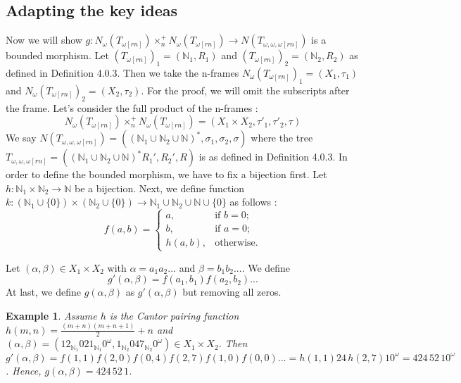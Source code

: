 \documentclass[12pt, a4paper]{scrartcl}
\newtheorem{example}[definition]{Example}
\begin{document}
\subsection{Adapting the key ideas}

    Now we will show $g : N_\omega(T_{\omega[rn]}) \times^+_n N_\omega(T_{\omega[rn]}) \rightarrow N(T_{\omega,\omega,\omega[rn]})$ is a bounded morphism. \newline 
    Let $(T_{\omega[rn]})_1 = (\mathbb{N}_{1}, R_1)$ and $(T_{\omega[rn]})_2 = (\mathbb{N}_{2}, R_2)$ as defined in Definition 4.0.3.
    Then we take the n-frames $N_\omega(T_{\omega[rn]})_1 = (X_1, \tau_1)$ and $N_\omega(T_{\omega[rn]})_2 = (X_2, \tau_2)$. For the proof, we will omit the subscripts after the frame. \newline \newline
    Let's consider the full product of the n-frames :
    $$N_\omega(T_{\omega[rn]}) \times^+_n N_\omega(T_{\omega[rn]}) = (X_1 \times X_2, \tau'_1, \tau'_2, \tau)$$
    \newline We say $N(T_{\omega,\omega,\omega[rn]}) = ((\mathbb{N}_1 \cup \mathbb{N}_2\cup \mathbb{N})^*, \sigma_1, \sigma_2, \sigma)$ where the tree $T_{\omega,\omega,\omega[rn]} = ((\mathbb{N}_1 \cup \mathbb{N}_2 \cup \mathbb{N})^*R_1',R_2',R)$ is as defined in Definition 4.0.3.
    \clearpage
    In order to define the bounded morphism, we have to fix a bijection first. Let $h : \mathbb{N}_1 \times \mathbb{N}_2 \rightarrow \mathbb{N}$ be a bijection. \newline
    Next, we define function $k :(\mathbb{N}_1 \cup \{0\}) \times (\mathbb{N}_2 \cup \{0\}) \rightarrow \mathbb{N}_1 \cup \mathbb{N}_2 \cup \mathbb{N} \cup \{0\}$ as follows :
    \[
        f(a, b) =
        \begin{cases}
        a, & \text{if } b = 0; \\
        b, & \text{if } a = 0; \\
        h(a, b), & \text{otherwise}.
        \end{cases}
    \]

    Let $(\alpha,\beta) \in X_1 \times X_2$ with $\alpha = a_1a_2...$ and $\beta = b_1b_2...$. We define 
    $$g'(\alpha,\beta) = f(a_1,b_1)f(a_2,b_2)...$$
    At last, we define $g(\alpha,\beta)$ as $g'(\alpha,\beta)$ but removing all zeros.

    \begin{example}
        Assume $h$ is the Cantor pairing function $h(m,n) = \frac{(m+n)(m+n+1)}{2} + n$ and $(\alpha, \beta) = (12_{\mathbb{N}_1}021_{\mathbb{N}_1}0^\omega, 1_{\mathbb{N}_2}047_{\mathbb{N}_2} 0^\omega) \in X_1 \times X_2$. \newline \newline
         Then $g'(\alpha, \beta) = f(1,1)f(2,0)f(0,4)f(2,7)f(1,0)f(0,0) ... = h(1,1)24 \, h(2,7)10^\omega = 424 \, 52 \, 10^\omega$.
         Hence, $g(\alpha, \beta) = 424 \, 52 \, 1$. 
    \end{example}
\end{document}
